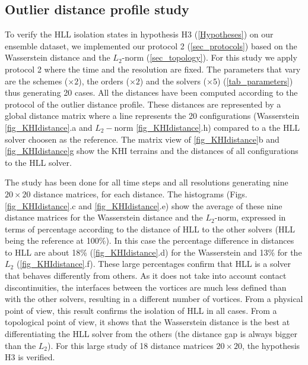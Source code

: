 \subsection{Outlier distance profile study}
\label{sec_KHIdistance}


To verify the HLL isolation states in hypothesis H3 (\autoref{Hypotheses}) on our ensemble dataset, we implemented our protocol 2 (\autoref{sec_protocols}) based on the Wasserstein distance and the $L_2$-norm (\autoref{sec_topology}). For this study we apply protocol 2 where the time and the resolution are fixed. The parameters that vary are the schemes ($\times 2$), the orders ($\times 2$) and the solvers ($\times 5$) (\autoref{tab_parameters}) thus generating 20 cases. All the distances have been computed according to the protocol of the outlier distance profile. These distances are represented by a global distance matrix where a line represents the 20 configurations (Wasserstein \autoref{fig_KHIdistance}.a and $L_2-$norm \autoref{fig_KHIdistance}.h) compared to a the HLL solver choosen as the reference. The matrix view of \autoref{fig_KHIdistance}b and \autoref{fig_KHIdistance}g show the KHI terrains and the distances of all configurations to the HLL solver.

The study has been done for all time steps and all resolutions generating nine
$20\times 20$ 
distance matrices, for each distance. The histograms (Figs. 
\ref{fig_KHIdistance}.c and \ref{fig_KHIdistance}.e) 
show the average 
of these nine distance matrices for the Wasserstein distance and the 
$L_2$-norm, expressed in terms of percentage according to the distance of HLL 
to the other solvers (HLL being the reference at 100\%). In this case the 
percentage difference in distances to HLL are about 18\% 
(\autoref{fig_KHIdistance}.d) for the Wasserstein and 13\% for the $L_2$ 
(\autoref{fig_KHIdistance}.f). These large percentages confirm that HLL is a 
solver that behaves differently from others.
As it does not take
into account contact discontinuities, the interfaces between the vortices
are much less defined than with the other solvers, resulting in a different
number of vortices. From a physical point of view, this result confirms the 
isolation of HLL in all cases. From a topological point of view, it shows that 
the Wasserstein distance is the best at differentiating the HLL solver from the 
others (the distance gap is always bigger than the $L_2$). For this large study 
of 18 distance matrices $20\times 20$, the hypothesis H3 is verified. 

